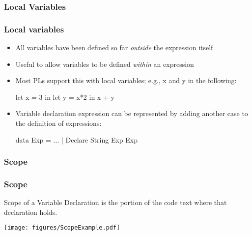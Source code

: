\documentclass{beamer}
\newenvironment{codeblock}[1][.8]{%
\begin{columns}
\begin{column}{#1\linewidth}
\begin{exampleblock}{}}{%
\end{exampleblock}
\end{column}
\end{columns}}
\begin{document}
\subsubsection{Local Variables}



\begin{frame}[fragile]
\frametitle{Local variables}

\begin{itemize}
\item All variables have been defined so far \emph{outside} the expression itself
\item Useful to allow variables to be defined \emph{within} an expression 

\pause
\item Most PLs support this with local variables; e.g., x and y in the following:
\begin{hcode}
let x = 3 in let y = x*2 in x + y
\end{hcode}

\pause
\item Variable declaration expression can be represented by adding another case to the definition of expressions: 
\begin{hcode}
data Exp = ...
         | Declare String Exp Exp
\end{hcode}
\end{itemize}

%

\end{frame}

\subsubsection{Scope}

\begin{frame}[fragile]
\frametitle{Scope}

\begin{block}{Scope of a Variable Declaration} is the portion of the code text where that declaration holds.
\end{block}

\begin{center}
\texttt{[image: figures/ScopeExample.pdf]}
\end{center}

\end{frame}
\end{document}
